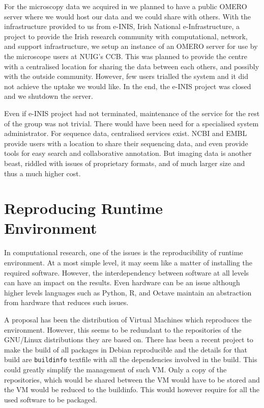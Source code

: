 For the microscopy data we acquired in  we planned
to have a public OMERO server where we would host our data and we
could share with others.  With the infrastructure provided to us from
e-INIS, Irish National e-Infrastructure, a project to provide the
Irish research community with computational, network, and support
infrastructure,  we setup an instance of an OMERO server for use by the
microscope users at NUIG's CCB.  This was planned to provide the
centre with a centralised location for sharing the data between each
others, and possibly with the outside community.  However, few users
trialled the system and it did not achieve the uptake we would like.
In the end, the e-INIS project was closed and we
shutdown the server.

Even if e-INIS project had not terminated, maintenance of the service
for the rest of the group was not trivial.  There would have been need
for a specialised system administrator.  For sequence data,
centralised services exist.  NCBI and EMBL provide users with a
location to share their sequencing data, and even provide tools for
easy search and collaborative annotation.  But imaging data is another
beast, riddled with issues of proprietary formats, and of much larger
size and thus a much higher cost.


\section{Reproducing Runtime Environment}

In computational research, one of the issues is the reproducibility of
runtime environment.  At a most simple level, it may seem like a
matter of installing the required software.  However, the
interdependency between software at all levels can have an impact on
the results.  Even hardware can be an issue although higher levels
languages such as Python, R, and Octave maintain an abstraction from
hardware that reduces such issues.

A proposal has been the distribution of Virtual Machines which
reproduces the environment.  However, this seems to be redundant to
the repositories of the GNU/Linux distributions they are based on.
There has been a recent project to make the build of all packages in
Debian reproducible and the details for that build are
\texttt{buildinfo} textfile with all the dependencies involved in the
build.  This could greatly simplify the management of such VM.  Only
a copy of the repositories, which would be shared between the VM would
have to be stored and the VM would be reduced to the buildinfo.
This would however require for all the used software to be packaged.

